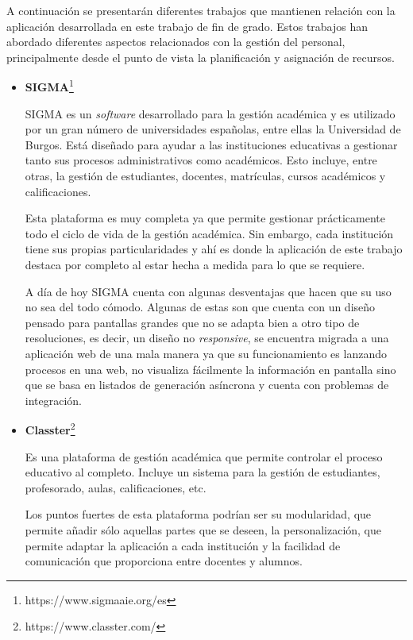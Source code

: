 
A continuación se presentarán diferentes trabajos que mantienen relación con la aplicación desarrollada en este trabajo de fin de grado.
Estos trabajos han abordado diferentes aspectos relacionados con la gestión del personal, principalmente desde el punto de vista la planificación y asignación de recursos.

\begin{itemize}
\item \textbf{SIGMA}\footnote{https://www.sigmaaie.org/es}

SIGMA es un \textit{software} desarrollado para la gestión académica y es utilizado por un gran número de universidades españolas, entre ellas la Universidad de Burgos.
Está diseñado para ayudar a las instituciones educativas a gestionar tanto sus procesos administrativos como académicos.
Esto incluye, entre otras, la gestión de estudiantes, docentes, matrículas, cursos académicos y calificaciones.

Esta plataforma es muy completa ya que permite gestionar prácticamente todo el ciclo de vida de la gestión académica. Sin embargo, cada institución tiene sus propias particularidades y ahí es donde la aplicación de este trabajo destaca por completo al estar hecha a medida para lo que se requiere.

A día de hoy SIGMA cuenta con algunas desventajas que hacen que su uso no sea del todo cómodo.
Algunas de estas son que cuenta con un diseño pensado para pantallas grandes que no se adapta bien a otro tipo de resoluciones, es decir, un diseño no \textit{responsive}, se encuentra migrada a una aplicación web de una mala manera ya que su funcionamiento es lanzando procesos en una web, no visualiza fácilmente la información en pantalla sino que se basa en listados de generación asíncrona y cuenta con problemas de integración.

\item \textbf{Classter}\footnote{https://www.classter.com/}

Es una plataforma de gestión académica que permite controlar el proceso educativo al completo.
Incluye un sistema para la gestión de estudiantes, profesorado, aulas, calificaciones, etc.

Los puntos fuertes de esta plataforma podrían ser su modularidad, que permite añadir sólo aquellas partes que se deseen, la personalización, que permite adaptar la aplicación a cada institución y la facilidad de comunicación que proporciona entre docentes y alumnos.


\end{itemize}
